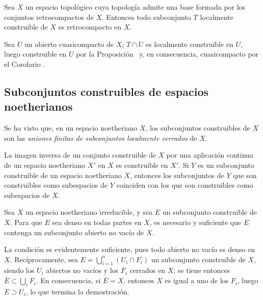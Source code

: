 \begin{corollary}[9.1.13]
\label{0.9.1.13}
\label{0.9.1.13-fr}
Sea $X$ un espacio topológico cuya topología admite una base formada por los conjuntos retrocompactos de $X$.
Entonces todo subconjunto $T$ localmente construible de $X$ es retrocompacto en $X$.
\end{corollary}


Sea $U$ un abierto cuasicompacto de $X$; $T\cap U$ es localmente construible en $U$, luego construible en $U$ por la Proposición~ y, en consecuencia, cuasicompacto por el Corolario .


\subsection{Subconjuntos construibles de espacios noetherianos}
\label{subsection:0.9.2}
\label{subsection:0.9.2-fr}

\begin{env}[9.2.1]
\label{0.9.2.1}
\label{0.9.2.1-fr}
Se ha visto  que, en un espacio noetheriano $X$, los subconjuntos construibles de $X$ son las \emph{uniones finitas de subconjuntos localmente cerrados} de $X$.

La imagen inversa de un conjunto construible de $X$ por una aplicación continua de un espacio noetheriano $X'$ en $X$ es construible en $X'$.
Si $Y$ es un subconjunto construible de un espacio noetheriano $X$, entonces los subconjuntos de $Y$ que son construibles como subespacios de $Y$ coinciden con los que son construibles como subespacios de $X$.
\end{env}

\begin{proposition}[9.2.2]
\label{0.9.2.2}
\label{0.9.2.2-fr}
Sea $X$ un espacio noetheriano irreducible, y sea $E$ un subconjunto construible de $X$.
Para que $E$ sea denso en todas partes en $X$, es necesario y suficiente que $E$ contenga un subconjunto abierto no vacío de $X$.
\end{proposition}


La condición es evidentemente suficiente, pues todo abierto no vacío es denso en $X$.
Recíprocamente, sea $E=\bigcup_{i=1}^n(U_i\cap F_i)$ un subconjunto construible de $X$, siendo los $U_i$ abiertos no vacíos y los $F_i$ cerrados en $X$; se tiene entonces $\overline{E}\subset\bigcup_i F_i$.
En consecuencia, si $\overline{E}=X$, entonces $X$ es igual a uno de los $F_i$, luego $E\supset U_i$, lo que termina la demostración.


